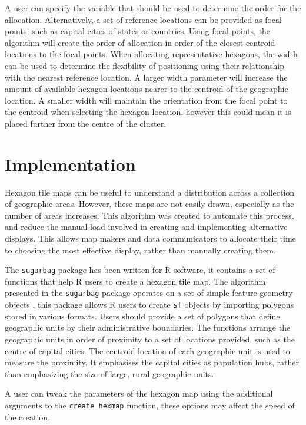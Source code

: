 \documentclass{monashthesis}
\begin{document}
A user can specify the variable that should be used to determine the order for the allocation. Alternatively, a set of reference locations can be provided as focal points, such as capital cities of states or countries. Using focal points, the algorithm will create the order of allocation in order of the closest centroid locations to the focal points.
When allocating representative hexagons, the width can be used to determine the flexibility of positioning using their relationship with the nearest reference location. A larger width parameter will increase the amount of available hexagon locations nearer to the centroid of the geographic location. A smaller width will maintain the orientation from the focal point to the centroid when selecting the hexagon location, however this could mean it is placed further from the centre of the cluster.

\hypertarget{implementation}{%
\section{Implementation}\label{implementation}}

Hexagon tile maps can be useful to understand a distribution across a collection of geographic areas. However, these maps are not easily drawn, especially as the number of areas increases. This algorithm was created to automate this process, and reduce the manual load involved in creating and implementing alternative displays. This allows map makers and data communicators to allocate their time to choosing the most effective display, rather than manually creating them.

The \texttt{sugarbag} package has been written for R software, it contains a set of functions that help R users to create a hexagon tile map.
The algorithm presented in the \texttt{sugarbag} package operates on a set of simple feature geometry objects \autocite{sf}, this package allows R users to create \texttt{sf} objects by importing polygons stored in various formats.
Users should provide a set of polygons that define geographic units by their administrative boundaries. The functions arrange the geographic units in order of proximity to a set of locations provided, such as the centre of capital cities.
The centroid location of each geographic unit is used to measure the proximity.
It emphasises the capital cities as population hubs, rather than emphasizing the size of large, rural geographic units.

A user can tweak the parameters of the hexagon map using the additional arguments to the \texttt{create\_hexmap} function, these options may affect the speed of the creation.
\end{document}
